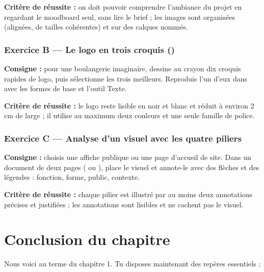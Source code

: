 \textbf{Critère de réussite :} on doit pouvoir comprendre l'ambiance du projet en regardant le moodboard seul, sans lire le brief ; les images sont organisées (alignées, de tailles cohérentes) et sur des calques nommés.

\subsubsection*{Exercice B --- Le logo en trois croquis ()}

\textbf{Consigne :} pour une boulangerie imaginaire, dessine au crayon dix croquis rapides de logo, puis sélectionne les trois meilleurs. Reproduis l'un d'eux dans  avec les formes de base et l'outil Texte.

\textbf{Critère de réussite :} le logo reste lisible en noir et blanc et réduit à environ 2 cm de large ; il utilise au maximum deux couleurs et une seule famille de police.

\subsubsection*{Exercice C --- Analyse d'un visuel avec les quatre piliers}

\textbf{Consigne :} choisis une affiche publique ou une page d'accueil de site. Dans un document de deux pages ( ou ), place le visuel et annote-le avec des flèches et des légendes : fonction, forme, public, contexte.

\textbf{Critère de réussite :} chaque pilier est illustré par au moins deux annotations précises et justifiées ; les annotations sont lisibles et ne cachent pas le visuel.

\section*{Conclusion du chapitre}

Nous voici au terme du chapitre 1. Tu disposes maintenant des repères essentiels :


